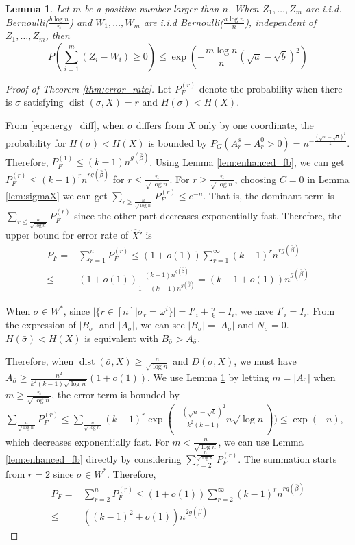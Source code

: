 \documentclass[journal]{IEEEtran}
\newtheorem{lemma}{Lemma}
\newcommand{\A}{\frac{a \log n}{n}}
\newcommand{\B}{\frac{b \log n}{n}}
\newcommand{\1}{\mathbbm{1}}
\DeclareMathOperator{\dist}{dist}
\begin{document}
\begin{lemma}\label{lem:mZW}
	Let $m$ be a positive number larger than $n$.
	When $Z_1, \dots, Z_m$ are i.i.d. Bernoulli($\B$) and $W_1, \dots, W_m$ are i.i.d Bernoulli($\A$), independent of $Z_1, \dots, Z_m$,
	then
	\begin{equation}
	P(\sum_{i=1}^m (Z_i  - W_i) \geq 0) \leq \exp(-\frac{m \log n}{n}(\sqrt{a} - \sqrt{b})^2)
	\end{equation}
\end{lemma}
\begin{proof}[Proof of Theorem \ref{thm:error_rate}]

	Let $P_F^{(r)}$ denote the probability when there is $\sigma$ satisfying $\dist(\sigma, X) = r$ and $H(\sigma) < H(X)$.
	
	From \eqref{eq:energy_diff}, when $\sigma$ differs from $X$ only by one coordinate, the probability for $H(\sigma) < H(X)$ is
	bounded by $P_G(A_r^s - A_r^0 > 0) = n^{-\frac{(\sqrt{a}-\sqrt{b})^2}{k}}$. Therefore, $P_F^{(1)}  \leq (k-1)n^{g(\bar{\beta})}$.
	Using Lemma \ref{lem:enhanced_fb}, we can get $P_F^{(r)} \leq (k-1)^r n^{rg(\bar{\beta})}$ for $ r \leq \frac{n}{\sqrt{\log n}}$.
	For $ r \geq \frac{n}{\sqrt{\log n}}$, choosing $C=0$ in Lemma \ref{lem:sigmaX} we can get $\sum_{r\geq \frac{n}{\sqrt{\log n}}}P_F^{(r)} \leq e^{-n}$.
	That is, the dominant term is $\sum_{r\leq \frac{n}{\sqrt{\log n}}}P_F^{(r)}$ since the other part decreases exponentially fast.
	Therefore, the upper bound for error rate of $\hat{X}'$ is
	\begin{align*}
	P_F = & \sum_{r=1}^n P_F^{(r)} \leq (1+o(1)) \sum_{r=1}^{\infty} (k-1)^r n^{rg(\bar{\beta})}\\
	\leq & (1+o(1))\frac{(k-1) n^{g(\bar{\beta})}}{1-(k-1) n^{g(\bar{\beta})}} = (k-1+o(1))n^{g(\bar{\beta})}
	\end{align*}
	
When $\sigma \in W^*$, since $|\{r\in [n] | \sigma_r = \omega^i \}| = I'_i + \frac{n}{k} - I_i $, we have $I'_i = I_i$.
From the expression of $|B_{\bar{\sigma}}|$ and $|A_{\bar{\sigma}}|$, we can see  $|B_{\bar{\sigma}}| = |A_{\bar{\sigma}}|$
and $N_{\bar{\sigma}} = 0$. $H(\bar{\sigma}) < H(X)$ is equivalent with $B_{\bar{\sigma}} > A_{\bar{\sigma}}$.

Therefore, when $ \dist(\bar{\sigma}, X) \geq \frac{n}{\sqrt{\log n} }$ and $D(\sigma, X)$,
we must have $A_{\bar{\sigma}} \geq \frac{n^2}{k^2(k-1)\sqrt{\log n} } (1+o(1))$.
We use Lemma \ref{lem:mZW} by letting $m=|A_{\bar{\sigma}}|$ when $m \geq \frac{n}{ \sqrt{\log n}}$, the error term is bounded
by $\sum_{\frac{n}{ \sqrt{\log n}}} P_F^{(r)} \leq \sum_{\frac{n}{ \sqrt{\log n}}} (k-1)^r \exp(-\frac{(\sqrt{a} - \sqrt{b})^2}{k^2(k-1)} n \sqrt{\log n}))
\leq \exp(-n)$, which decreases exponentially fast.
For $m < \frac{n}{ \sqrt{\log n}}$, we can use Lemma \ref{lem:enhanced_fb} directly 
by considering $\sum_{r=2}^{\frac{n}{ \sqrt{\log n}}} P_F^{(r)}$. The summation starts from $r=2$ since $\sigma \in W^*$.
Therefore,
\begin{align*}
P_F = & \sum_{r=2}^n P_F^{(r)} \leq (1+o(1)) \sum_{r=2}^{\infty} (k-1)^r n^{rg(\bar{\beta})}\\
\leq & ((k-1)^2+o(1))n^{2g(\bar{\beta})}
\end{align*}
\end{proof}


\end{document}

